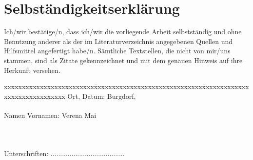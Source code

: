 \chapter*{Selbst{\"a}ndigkeitserkl{\"a}rung}
\label{chap:selbstaendigkeitserklaerung}

\vspace*{10mm} 

Ich/wir best{\"a}tige/n, dass ich/wir die vorliegende Arbeit selbstst{\"a}ndig und ohne Benutzung anderer als der im Literaturverzeichnis angegebenen Quellen und Hilfsmittel angefertigt habe/n. S{\"a}mtliche Textstellen, die nicht von mir/uns stammen, sind als Zitate gekennzeichnet und mit dem genauen Hinweis auf ihre Herkunft versehen. 

\vspace{15mm}

\begin{tabbing}
xxxxxxxxxxxxxxxxxxxxxxxxx\=xxxxxxxxxxxxxxxxxxxxxxxxxxxxxx\=xxxxxxxxxxxxxxxxxxxxxxxxxxxxxx\kill
Ort, Datum:		\> Burgdorf, \versiondate \\ \\ 
Namen Vornamen:	\> Verena Mai \\ \\ \\ \\ 
Unterschriften:	\> ....................................... \\
\end{tabbing}

